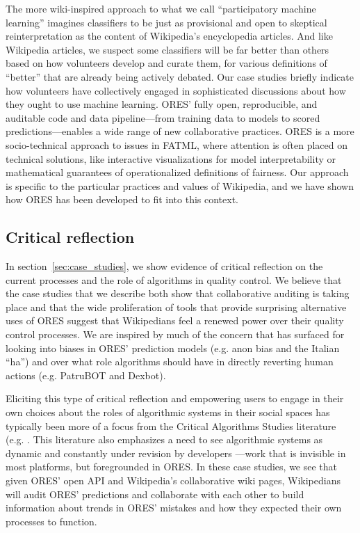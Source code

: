 The more wiki-inspired approach to what we call ``participatory machine learning'' imagines classifiers to be just as provisional and open to skeptical reinterpretation as the content of Wikipedia's encyclopedia articles. And like Wikipedia articles, we suspect some classifiers will be far better than others based on how volunteers develop and curate them, for various definitions of ``better'' that are already being actively debated. Our case studies briefly indicate how volunteers have collectively engaged in sophisticated discussions about how they ought to use machine learning. ORES' fully open, reproducible, and auditable code and data pipeline---from training data to models to scored predictions---enables a wide range of new collaborative practices. ORES is a more socio-technical approach to issues in FATML, where attention is often placed on technical solutions, like interactive visualizations for model interpretability or mathematical guarantees of operationalized definitions of fairness. Our approach is specific to the particular practices and values of Wikipedia, and we have shown how ORES has been developed to fit into this context.

\subsection{Critical reflection}
In section~\ref{sec:case_studies}, we show evidence of critical reflection on the current processes and the role of algorithms in quality control.  We believe that the case studies that we describe both show that collaborative auditing is taking place and that the wide proliferation of tools that provide surprising alternative uses of ORES suggest that Wikipedians feel a renewed power over their quality control processes.  We are inspired by much of the concern that has surfaced for looking into biases in ORES' prediction models (e.g. anon bias and the Italian ``ha'') and over what role algorithms should have in directly reverting human actions (e.g. PatruBOT and Dexbot).

Eliciting this type of critical reflection and empowering users to engage in their own choices about the roles of algorithmic systems in their social spaces has typically been more of a focus from the Critical Algorithms Studies literature (e.g. \cite{barocas2013governing, kitchin2017thinking}. This literature also emphasizes a need to see algorithmic systems as dynamic and constantly under revision by developers \cite{seaver2017algorithms}---work that is invisible in most platforms, but foregrounded in ORES. In these case studies, we see that given ORES' open API and Wikipedia's collaborative wiki pages, Wikipedians will audit ORES' predictions and collaborate with each other to build information about trends in ORES' mistakes and how they expected their own processes to function.

